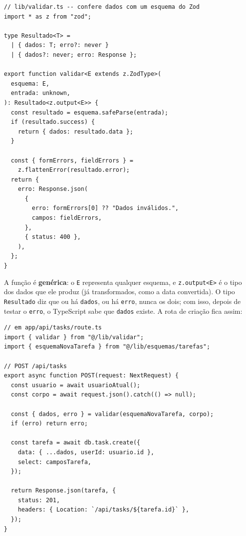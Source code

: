 \begin{codigo}
\begin{Verbatim}[breaklines=true, breaksymbolleft={}, fontsize=\footnotesize]
// lib/validar.ts -- confere dados com um esquema do Zod
import * as z from "zod";

type Resultado<T> =
  | { dados: T; erro?: never }
  | { dados?: never; erro: Response };

export function validar<E extends z.ZodType>(
  esquema: E,
  entrada: unknown,
): Resultado<z.output<E>> {
  const resultado = esquema.safeParse(entrada);
  if (resultado.success) {
    return { dados: resultado.data };
  }

  const { formErrors, fieldErrors } =
    z.flattenError(resultado.error);
  return {
    erro: Response.json(
      {
        erro: formErrors[0] ?? "Dados inválidos.",
        campos: fieldErrors,
      },
      { status: 400 },
    ),
  };
}
\end{Verbatim}
\end{codigo}

A função é \textbf{genérica}: o \texttt{E} representa qualquer esquema, e \texttt{z.output<E>} é o tipo dos dados que ele produz (já transformados, como a data convertida). O tipo \texttt{Resultado} diz que ou há \texttt{dados}, ou há \texttt{erro}, nunca os dois; com isso, depois de testar o \texttt{erro}, o TypeScript sabe que \texttt{dados} existe. A rota de criação fica assim:

\begin{codigo}
\begin{Verbatim}[breaklines=true, breaksymbolleft={}, fontsize=\footnotesize]
// em app/api/tasks/route.ts
import { validar } from "@/lib/validar";
import { esquemaNovaTarefa } from "@/lib/esquemas/tarefas";

// POST /api/tasks
export async function POST(request: NextRequest) {
  const usuario = await usuarioAtual();
  const corpo = await request.json().catch(() => null);

  const { dados, erro } = validar(esquemaNovaTarefa, corpo);
  if (erro) return erro;

  const tarefa = await db.task.create({
    data: { ...dados, userId: usuario.id },
    select: camposTarefa,
  });

  return Response.json(tarefa, {
    status: 201,
    headers: { Location: `/api/tasks/${tarefa.id}` },
  });
}
\end{Verbatim}
\end{codigo}

